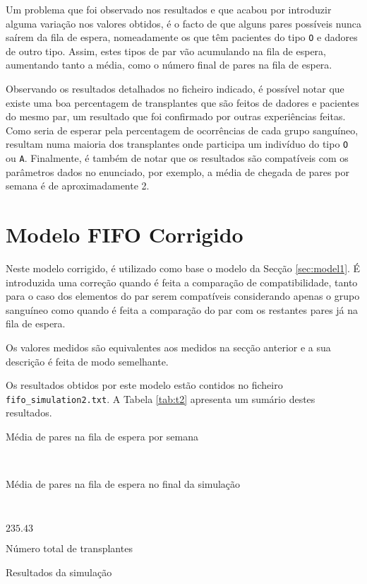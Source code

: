 \documentclass[10pt,a4paper,oneside]{article}
\begin{document}
Um problema que foi observado nos resultados e que acabou por
introduzir alguma variação nos valores obtidos, é o facto de que
alguns pares possíveis nunca saírem da fila de espera, nomeadamente os
que têm pacientes do tipo \texttt{O} e dadores de outro tipo. Assim,
estes tipos de par vão acumulando na fila de espera, aumentando tanto
a média, como o número final de pares na fila de espera.

Observando os resultados detalhados no ficheiro indicado, é possível
notar que existe uma boa percentagem de transplantes que são feitos de
dadores e pacientes do mesmo par, um resultado que foi confirmado por
outras experiências feitas. Como seria de esperar pela percentagem de
ocorrências de cada grupo sanguíneo, resultam numa maioria dos
transplantes onde participa um indivíduo do tipo \texttt{O} ou
\texttt{A}. Finalmente, é também de notar que os resultados são
compatíveis com os parâmetros dados no enunciado, por exemplo, a média
de chegada de pares por semana é de aproximadamente 2.



\section{Modelo FIFO Corrigido}
\label{sec:model2}

Neste modelo corrigido, é utilizado como base o modelo da Secção
\ref{sec:model1}. É introduzida uma correção quando é feita a
comparação de compatibilidade, tanto para o caso dos elementos do par
serem compatíveis considerando apenas o grupo sanguíneo como quando é
feita a comparação do par com os restantes pares já na fila de
espera.

Os valores medidos são equivalentes aos medidos na secção anterior e a
sua descrição é feita de modo semelhante.

Os resultados obtidos por este modelo estão contidos no ficheiro
\texttt{fifo\_simulation2.txt}. A Tabela \ref{tab:t2} apresenta um
sumário destes resultados.

\begin{table}[h]
  \centering
  \begin{subtable}[h]{0.3\textwidth}
    \caption{Média de pares na fila de espera por semana}
  \end{subtable}
  ~
  \begin{subtable}[h]{0.3\textwidth}
    \caption{Média de pares na fila de espera no final da simulação}
  \end{subtable}
  ~
  \begin{subtable}[h]{0.3\textwidth}
    \centering
    $235.43$
    \caption{Número total de transplantes}
  \end{subtable}

  \caption{Resultados da simulação}
  \label{tab:t2}
\end{table}
\end{document}
